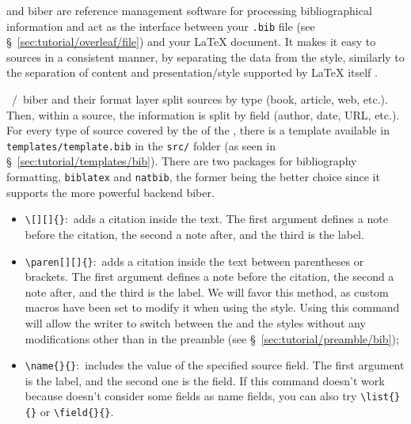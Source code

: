  and biber are \gls{reference} management software for processing bibliographical information and act as the interface between your \texttt{.bib} file (see \S~\ref{sec:tutorial/overleaf/file}) and your \LaTeX{} document. It makes it easy to  \glspl{source} in a consistent manner, by separating the data from the style, similarly to the separation of content and presentation/style supported by \LaTeX{} itself \parencite{web:bibtex-wiki}.

~/~biber and their format layer \BibLaTeX{} split \glspl{source} by type (book, article, web, etc.). Then, within a \gls{source}, the information is split by field (author, date, \gls{URL}, etc.). For every type of \gls{source} covered by the  of the  \parencites{report:udes-writing-guide}, there is a template available in \texttt{templates/template.bib} in the \texttt{src/} folder (as seen in \S~\ref{sec:tutorial/templates/bib}). There are two \glspl{package} for bibliography formatting, \texttt{biblatex} and \texttt{natbib}, the former being the better choice since it supports the more powerful backend biber.

\begin{itemize}
    \item \texttt{\textbackslash{}[][]\{\}}:~adds a \gls{citation} inside the text. The first \gls{argument} defines a note before the \gls{citation}, the second a note after, and the third is the \gls{label}.
    \item \texttt{\textbackslash{}paren[][]\{\}}:~adds a \gls{citation} inside the text between parentheses or brackets. The first argument defines a note before the \gls{citation}, the second a note after, and the third is the \gls{label}. We will favor this method, as custom \glspl{macro} have been set to modify it when using the   style. Using this \gls{command} will allow the writer to switch between the  and the   styles without any modifications other than in the preamble (see \S~\ref{sec:tutorial/preamble/bib});
    \item \texttt{\textbackslash{}name\{\}\{\}}:~includes the \gls{value} of the specified \gls{source} field. The first argument is the \gls{label}, and the second one is the field. If this \gls{command} doesn't work because \BibLaTeX{} doesn't consider some fields as name fields, you can also try \texttt{\textbackslash{}list\{\}\{\}} or \texttt{\textbackslash{}field\{\}\{\}}.
\end{itemize}

